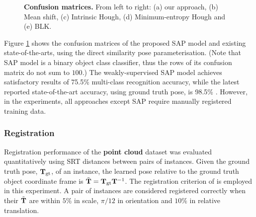 \begin{figure}[ht]
\begin{subfigure}[t]{0.32\linewidth}
	\end{subfigure}
	\caption{\textbf{Confusion matrices.} From left to right: (a) our approach, (b) Mean shift, (c) Intrinsic Hough, (d) Minimum-entropy Hough and (e) BLK.}
	\label{fig/reg/recresult3d}
\end{figure}




Figure \ref{fig/reg/recresult3d} shows the confusion matrices of the proposed SAP model and existing state-of-the-arts, using the direct similarity pose parameterisation. (Note that SAP model is a binary object class classifier, thus the rows of its confusion matrix do not sum to $100$.)
The weakly-supervised SAP model achieves satisfactory results of 75.5\% multi-class recognition accuracy, while the latest reported state-of-the-art accuracy, using ground truth pose, is 98.5\% \cite{Woodford2013}. However, in the experiments, all approaches except SAP require manually registered training data.    

\subsubsection{Registration} 
\label{sec/reg/reg}
Registration performance of the \textbf{point cloud} dataset was evaluated quantitatively using SRT distances \cite{Pham2011} between pairs of instances. Given the ground truth pose, $\mathbf{T}_\mathrm{gt}$, of an instance, the learned pose relative to the ground truth object coordinate frame is $\tilde{\mathbf{T}} = \mathbf{T}_\mathrm{gt}\mathbf{T}^{-1}$.  
The registration criterion of \cite{Pham2011} is employed in this experiment. A pair of instances are considered registered correctly when their $\tilde{\mathbf{T}}$ are within $5\%$ in scale, $\pi/12$ in orientation and $10\%$ in relative translation.

